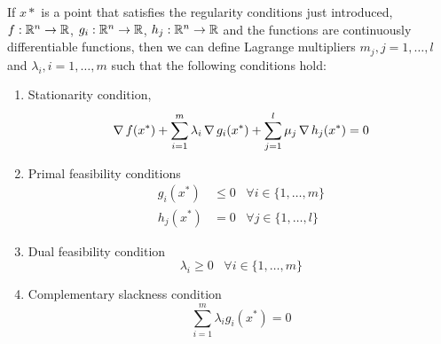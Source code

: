 If $x*$ is a point that satisfies the regularity conditions just introduced, $f: \mathbb{R}^n \rightarrow
	\mathbb{R}$, $g_i: \mathbb{R}^n \rightarrow \mathbb{R}$, $h_j: \mathbb{R}^n \rightarrow \mathbb{R}$ and the functions are continuously
differentiable functions, then we can define Lagrange multipliers $m_j, j = 1, \ldots, l$ and
$\lambda_i, i = 1, \ldots, m$ such that the following conditions hold:
\begin{enumerate}
	\item Stationarity condition,
	      \begin{equation*}
		      \operatorname*{\nabla}{f(x^*)} + \sum_{i = 1}^m{\lambda_i\operatorname*{\nabla}{g_i(x^*)}} + \sum_{j =
			      1}^l{\mu_j\operatorname*{\nabla}{h_j(x^*)}} = 0
	      \end{equation*}
	\item Primal feasibility conditions
	      \begin{equation*}
		      \begin{aligned}
			      g_i(x^*) & \leq 0 \hspace{10pt} \forall i \in \{1, \ldots, m\} \\
			      h_j(x^*) & = 0 \hspace{10pt} \forall j \in \{1, \ldots, l\}
		      \end{aligned}
	      \end{equation*}
	\item Dual feasibility condition
	      \begin{equation*}
		      \lambda_i \geq 0 \hspace{10pt} \forall i \in \{1, \ldots, m\}
	      \end{equation*}
	\item Complementary slackness condition
	      \begin{equation*}
		      \sum_{i = 1}^m \lambda_i g_i(x^*) = 0
	      \end{equation*}
\end{enumerate}

